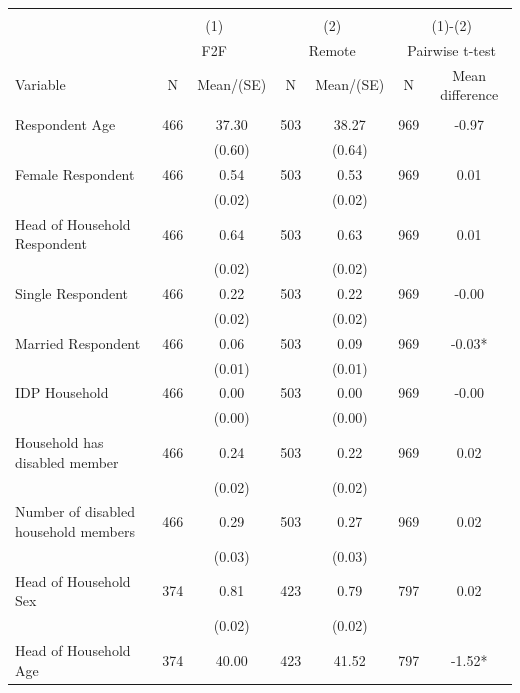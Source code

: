 \begin{tabular}{@{\extracolsep{5pt}}lcccccc}
\\[-1.8ex]\hline \hline \\[-1.8ex]
 & \multicolumn{2}{c}{(1)}  & \multicolumn{2}{c}{(2)}  & \multicolumn{2}{c}{(1)-(2)} \\
 & \multicolumn{2}{c}{F2F}  & \multicolumn{2}{c}{Remote}  & \multicolumn{2}{c}{Pairwise t-test}  \\
Variable & N & Mean/(SE) & N & Mean/(SE) & N & Mean difference \\ \hline \\[-1.8ex] 
Respondent Age   & 466    & 37.30    & 503    & 38.27    & 969    & -0.97   \\
 &   & (0.60)  &   & (0.64)  &   &  \\ [1ex]
Female Respondent   & 466    & 0.54    & 503    & 0.53    & 969    & 0.01   \\
 &   & (0.02)  &   & (0.02)  &   &  \\ [1ex]
Head of Household Respondent   & 466    & 0.64    & 503    & 0.63    & 969    & 0.01   \\
 &   & (0.02)  &   & (0.02)  &   &  \\ [1ex]
Single Respondent   & 466    & 0.22    & 503    & 0.22    & 969    & -0.00   \\
 &   & (0.02)  &   & (0.02)  &   &  \\ [1ex]
Married Respondent   & 466    & 0.06    & 503    & 0.09    & 969    & -0.03*   \\
 &   & (0.01)  &   & (0.01)  &   &  \\ [1ex]
IDP Household   & 466    & 0.00    & 503    & 0.00    & 969    & -0.00   \\
 &   & (0.00)  &   & (0.00)  &   &  \\ [1ex]
Household has disabled member   & 466    & 0.24    & 503    & 0.22    & 969    & 0.02   \\
 &   & (0.02)  &   & (0.02)  &   &  \\ [1ex]
Number of disabled household members   & 466    & 0.29    & 503    & 0.27    & 969    & 0.02   \\
 &   & (0.03)  &   & (0.03)  &   &  \\ [1ex]
Head of Household Sex   & 374    & 0.81    & 423    & 0.79    & 797    & 0.02   \\
 &   & (0.02)  &   & (0.02)  &   &  \\ [1ex]
Head of Household Age   & 374    & 40.00    & 423    & 41.52    & 797    & -1.52*   \\

\end{tabular}
